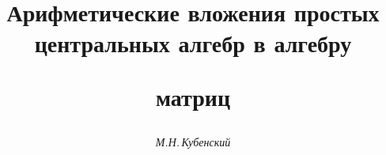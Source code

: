 

 


% 


\newcommand{\tts}[1]{} 


 




 


\setcounter{page}{28} 












 


\author{\it М.Н.\,Кубенский} 




\title{Арифметические вложения простых центральных алгебр в алгебру 


матриц} 


 


\date{} 




\pagestyle{plain} %


 




\maketitle 


\label{begin} 


